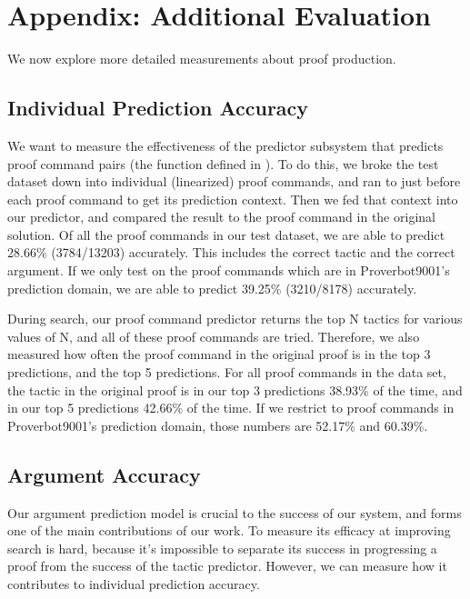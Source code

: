 \documentclass[sigplan,screen]{acmart}
\newcommand{\name}{Proverbot9001\xspace}
\renewcommand{\>}{\quad}
\begin{document}
\clearpage
\appendix
\section{Appendix: Additional Evaluation}
\label{sec:appendix}

We now explore more detailed measurements about proof production.










\subsection{Individual Prediction Accuracy}
\label{ssec:individual}

We want to measure the effectiveness of the predictor subsystem that predicts proof command pairs (the  function defined in ).
To do this, we broke the test dataset down into individual (linearized) proof commands,
  and ran to just before each proof command to get its prediction context.
Then we fed that context into our predictor,
  and compared the result to the proof command in the original solution.
Of all the proof commands in our test dataset,
  we are able to predict 28.66\% (3784/13203) accurately.
This includes the correct tactic and the correct argument.
If we only test on the proof commands which are in \name{}'s prediction domain,
  we are able to predict 39.25\% (3210/8178) accurately.

During search, our proof command predictor returns the top N tactics for various values of N,
  and all of these proof commands are tried.
Therefore, we also measured how often the proof command in the original proof
  is in the top 3 predictions, and the top 5 predictions.
For all proof commands in the data set, the tactic in the original proof
  is in our top 3 predictions 38.93\% of the time, and in our top 5 predictions 42.66\% of the time.
If we restrict to proof commands in \name{}'s prediction domain, those numbers are 52.17\% and 60.39\%.

\subsection{Argument Accuracy}

Our argument prediction model is crucial to the success of our system,
  and forms one of the main contributions of our work.
To measure its efficacy at improving search is hard,
  because it's impossible to separate its success in progressing a proof
  from the success of the tactic predictor.
However, we can measure how it contributes to individual prediction accuracy.
\end{document}

